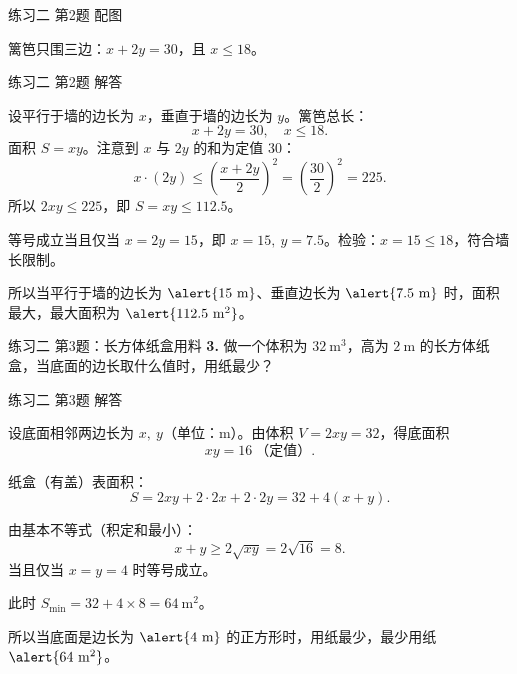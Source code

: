 \documentclass[10pt,aspectratio=169,serif]{beamer}
\begin{document}
\begin{frame}[t]{练习二 第2题 配图}
\begin{center}
\end{center}
\vspace{0.5em}
{\small 篱笆只围三边：$x+2y=30$，且 $x\le 18$。}
\end{frame}

\begin{frame}[t]{练习二 第2题 解答}
\begin{tcolorbox}[colback=orange!10,colframe=orange,title=\textbf{解}]
设平行于墙的边长为 $x$，垂直于墙的边长为 $y$。篱笆总长：
\[
x+2y=30,\quad x\le 18.
\]
面积 $S=xy$。注意到 $x$ 与 $2y$ 的和为定值 $30$：
\[
x\cdot(2y)\le \left(\frac{x+2y}{2}\right)^2=\left(\frac{30}{2}\right)^2=225.
\]
所以 $2xy\le 225$，即 $S=xy\le 112.5$。

等号成立当且仅当 $x=2y=15$，即 $x=15,\ y=7.5$。检验：$x=15\le 18$，符合墙长限制。

\vspace{0.3em}
所以当平行于墙的边长为 $\alert{15\ \mathrm{m}}$、垂直边长为 $\alert{7.5\ \mathrm{m}}$ 时，面积最大，最大面积为 $\alert{112.5\ \mathrm{m^2}}$。
\end{tcolorbox}
\end{frame}

\begin{frame}[t]{练习二 第3题：长方体纸盒用料}
\textbf{3.} 做一个体积为 $32\ \mathrm{m^3}$，高为 $2\ \mathrm{m}$ 的长方体纸盒，当底面的边长取什么值时，用纸最少？
\end{frame}

\begin{frame}[t]{练习二 第3题 解答}
\begin{tcolorbox}[colback=orange!10,colframe=orange,title=\textbf{解}]
设底面相邻两边长为 $x,\ y$（单位：m）。由体积 $V=2xy=32$，得底面积
\[
xy=16\ \text{（定值）}.
\]

纸盒（有盖）表面积：
\[
S=2xy+2\cdot 2x+2\cdot 2y=32+4(x+y).
\]

由基本不等式（积定和最小）：
\[
x+y\ge 2\sqrt{xy}=2\sqrt{16}=8.
\]
当且仅当 $x=y=4$ 时等号成立。

此时 $S_{\min}=32+4\times 8=64\ \mathrm{m^2}$。

\vspace{0.3em}
所以当底面是边长为 $\alert{4\ \mathrm{m}}$ 的正方形时，用纸最少，最少用纸 $\alert{64\ \mathrm{m^2}}$。
\end{tcolorbox}
\end{frame}
\end{document}
